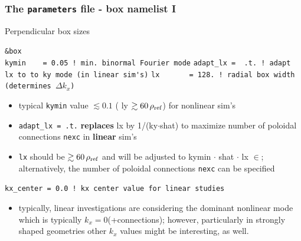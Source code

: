 \documentclass[9pt]{beamer}
\begin{document}
\begin{frame}[fragile]
  \frametitle{The {\tt parameters} file - box namelist I}

\begin{block}{Perpendicular box sizes}

\begin{block}

\verb|&box|\\
\verb|kymin    = 0.05 ! min. binormal Fourier mode|
\verb|adapt_lx =  .t. ! adapt lx to to ky mode (in linear sim's)|
\verb|lx       = 128. ! radial box width (determines |$\Delta k_x$\verb|)|
\end{block}

\begin{itemize}
\item typical {\tt kymin} value $\lesssim 0.1$ ( ly $\gtrsim 60\,\rho_{\rm ref}$) for nonlinear sim's
\item {\tt adapt\_lx = .t.} {\bf replaces} lx by 1/(ky$\cdot$shat)
 to maximize number of poloidal connections {\tt nexc} in {\bf linear} sim's
\item {\tt lx} should be $\gtrsim 60\,\rho_{\rm ref}$ and will be adjusted to
kymin $\cdot$ shat $\cdot$ lx $\in$\Nat ;\\
alternatively, the number of poloidal connections {\tt nexc} can be specified
\end{itemize}

\begin{block}

\verb|kx_center = 0.0 ! kx center value for linear studies|
\end{block}
\begin{itemize}
\item typically, linear investigations are considering the dominant nonlinear mode which
is typically $k_x=0$(+connections); however, particularly in strongly shaped geometries other $k_x$
values might be interesting, as well.
\end{itemize}


\end{block}
\end{frame}

\end{document}
